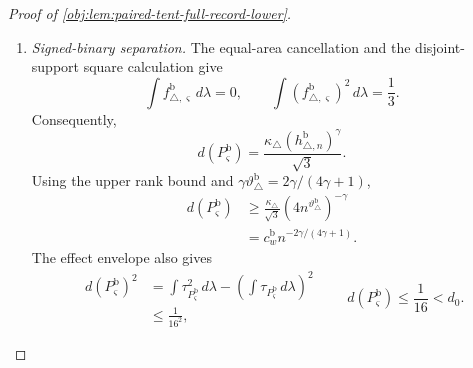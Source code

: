 \documentclass[11pt]{article}
\begin{document}
\begin{proof}[Proof of \cref{obj:lem:paired-tent-full-record-lower}]
\begin{enumerate}
\item \emph{Signed-binary separation.}
The equal-area cancellation and the disjoint-support square calculation give
\[
\int f_{\triangle,\varsigma}^{\mathrm b}\,d\lambda=0,
\qquad
\int(f_{\triangle,\varsigma}^{\mathrm b})^2\,d\lambda=\frac13.
\]
Consequently,
\[
d(P_\varsigma^{\mathrm b})
=\frac{\kappa_\triangle(h_{\triangle,n}^{\mathrm b})^\gamma}{\sqrt3}.
\]
Using the upper rank bound and
\(\gamma\vartheta_\triangle^{\mathrm b}=2\gamma/(4\gamma+1)\),
\[
\begin{aligned}
d(P_\varsigma^{\mathrm b})
&\ge
\frac{\kappa_\triangle}{\sqrt3}
(4n^{\vartheta_\triangle^{\mathrm b}})^{-\gamma}\\
&=
c_w^{\mathrm b}n^{-2\gamma/(4\gamma+1)}.
\end{aligned}
\]
The effect envelope also gives
\[
\begin{aligned}
d(P_\varsigma^{\mathrm b})^2
&=
\int\tau_{P_\varsigma^{\mathrm b}}^2\,d\lambda
-\left(\int\tau_{P_\varsigma^{\mathrm b}}\,d\lambda\right)^2\\
&\le\frac1{16^2},
\end{aligned}
\qquad
d(P_\varsigma^{\mathrm b})\le\frac1{16}<d_0.
\]


\end{enumerate}
\end{proof}
\end{document}
